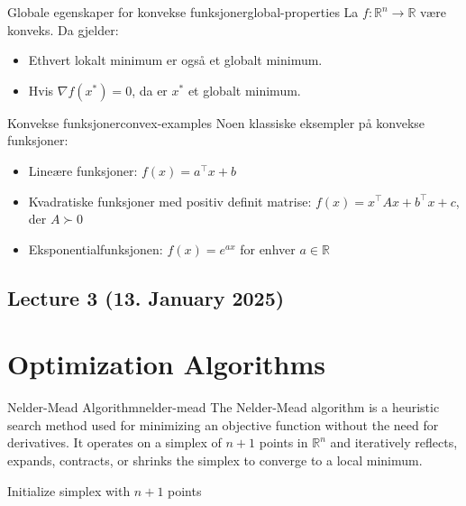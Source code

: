 \begin{theorem}{Globale egenskaper for konvekse funksjoner}{global-properties}
  La $f: \mathbb{R}^n \to \mathbb{R}$ være konveks. Da gjelder:
  \begin{itemize}
    \item Ethvert lokalt minimum er også et globalt minimum.
    \item Hvis $\nabla f(x^*) = 0$, da er $x^*$ et globalt minimum.
  \end{itemize}
\end{theorem}

\begin{example}{Konvekse funksjoner}{convex-examples}
  Noen klassiske eksempler på konvekse funksjoner:
  \begin{itemize}
    \item Lineære funksjoner: $f(x) = a^\top x + b$
    \item Kvadratiske funksjoner med positiv definit matrise: $f(x) = x^\top Ax + b^\top x + c$, der $A \succ 0$
    \item Eksponentialfunksjonen: $f(x) = e^{ax}$ for enhver $a \in \mathbb{R}$
  \end{itemize}
\end{example}


\subsection{Lecture 3 (13. January 2025)}
\section*{Optimization Algorithms}

\begin{definition}{Nelder-Mead Algorithm}{nelder-mead}
  The Nelder-Mead algorithm is a heuristic search method used for minimizing an objective function without the need for derivatives. It operates on a simplex of \( n+1 \) points in \( \mathbb{R}^n \) and iteratively reflects, expands, contracts, or shrinks the simplex to converge to a local minimum.

\end{definition}

\begin{algorithm}[H]
  \caption{Nelder-Mead Algorithm}
  \label{alg:nelder-mead}
  Initialize simplex with $n+1$ points\;
\end{algorithm}

